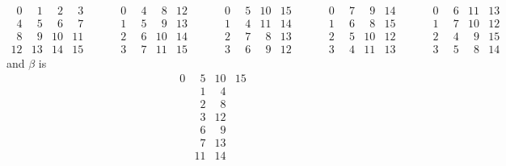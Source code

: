 


\printbibliography





\[
\begin{matrix}
  \phantom{0}0 &   \phantom{0}1 &   \phantom{0}2 &   \phantom{0}3\\
    \phantom{0}4 &   \phantom{0}5 &   \phantom{0}6 &   \phantom{0}7\\
    \phantom{0}8 &   \phantom{0}9 & 10 & 11\\
  12 & 13 & 14 & 15
\end{matrix}
\qquad
\begin{matrix}
  \phantom{0}0 &   \phantom{0}4 &   \phantom{0}8 & 12\\
  \phantom{0}1 &   \phantom{0}5 &   \phantom{0}9 & 13\\
  \phantom{0}2 &   \phantom{0}6 & 10 & 14\\
  \phantom{0}3 &   \phantom{0}7 & 11 & 15
\end{matrix}
\qquad
\begin{matrix}
  \phantom{0}0 &   \phantom{0}5 &  10 & 15\\
  \phantom{0}1 &   \phantom{0}4 &  11 & 14\\
  \phantom{0}2 &   \phantom{0}7 & \phantom{0}8 & 13\\
  \phantom{0}3 &   \phantom{0}6 & \phantom{0}9 & 12
\end{matrix}
\qquad
\begin{matrix}
  \phantom{0}0 &   \phantom{0}7 & \phantom{0}9 & 14\\
  \phantom{0}1 &   \phantom{0}6 & \phantom{0}8 & 15\\
  \phantom{0}2 &   \phantom{0}5 & 10 & 12\\
  \phantom{0}3 &   \phantom{0}4 & 11 & 13
\end{matrix}
\qquad
\begin{matrix}
  \phantom{0}0 &   \phantom{0}6 & 11 & 13\\
  \phantom{0}1 &   \phantom{0}7 & 10 & 12\\
  \phantom{0}2 &   \phantom{0}4 & \phantom{0}9 & 15\\
  \phantom{0}3 &   \phantom{0}5 & \phantom{0}8 & 14
\end{matrix}
\]
and $\beta$ is 
\[
\begin{matrix}
  \phantom{0}0 &   \phantom{0}5 &  10 & 15\\
&  \phantom{0}1 &   \phantom{0}4 & \\
&  \phantom{0}2 & \phantom{0}8 &\\
&  \phantom{0}3 &   12 & \\
& \phantom{0}6 & \phantom{0}9 & \\
&  \phantom{0}7 & 13 &\\
& 11 & 14 & 
\end{matrix}
\]
